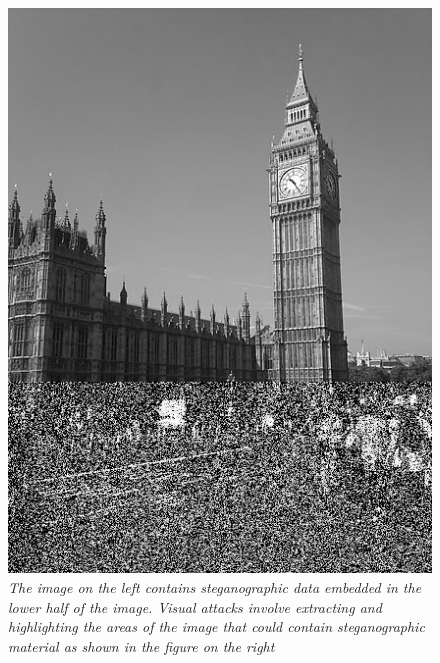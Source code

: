 \begin{figure}[h!]
\includegraphics[scale=0.5]{visual2}
\caption{\emph{The image on the left contains steganographic data embedded in the lower half of the image. Visual attacks involve extracting and highlighting the areas of the image that could contain steganographic material as shown in the figure on the right}}
\label{fig:visualattacks}
\end{figure} 

